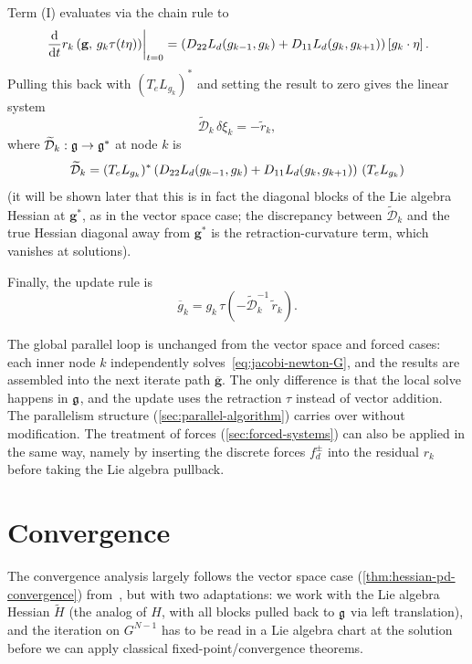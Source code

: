 Term (I) evaluates via the chain rule to
\[
	\odv*{r_k\left(\mathbf{g},\, g_k\tau(t\eta)\right)}{t}_{t=0}
	= \left(\mdif{22}\Ld(g_{k-1},g_k) + \mdif{11}\Ld(g_k,g_{k+1})\right)\left[g_k \cdot \eta\right].
\]
Pulling this back with $(T_e L_{g_k})^*$ and setting the result to zero gives the linear system
\begin{equation}
	\widetilde{\mathcal{D}}_k\, \delta \xi_k = -\widetilde{r}_k,
	\tag{Jacobi-Newton-G}
	\label{eq:jacobi-newton-G}
\end{equation}
where $\widetilde{\mathcal{D}}_k : {\mathfrak{g}} \to {\mathfrak{g}}^*$ at node $k$ is
\begin{equation}
	\widetilde{\mathcal{D}}_k = (T_e L_{g_k})^* \left(D_{22} L_d(g_{k-1}, g_k) + D_{11} L_d(g_k, g_{k+1})\right)\, (T_e L_{g_k})
	\label{eq:lie-jacobi-newton-blocks}
\end{equation}
(it will be shown later that this is in fact the diagonal blocks of the Lie algebra Hessian at $\mathbf{g}^*$, as in the vector space case; the discrepancy between $\widetilde{\mathcal{D}}_k$ and the true Hessian diagonal away from $\mathbf{g}^*$ is the retraction-curvature term, which vanishes at solutions).

Finally, the update rule is
\begin{equation}
	\overline{g}_k = g_k\, \tau\left(-\widetilde{\mathcal{D}}_k^{-1}\, \widetilde{r}_k\right).
	\label{eq:jacobi-newton-G-update}
\end{equation}

The global parallel loop is unchanged from the vector space and forced cases: each inner node $k$ independently solves~\eqref{eq:jacobi-newton-G}, and the results are assembled into the next iterate path $\overline{\mathbf{g}}$.
The only difference is that the local solve happens in ${\mathfrak{g}}$, and the update uses the retraction $\tau$ instead of vector addition.
The parallelism structure (\cref{sec:parallel-algorithm}) carries over without modification. The treatment of forces (\cref{sec:forced-systems}) can also be applied in the same way, namely by inserting the discrete forces $f_d^\pm$ into the residual $r_k$ before taking the Lie algebra pullback.

\section{Convergence}\label{sec:lie-groups-convergence}

The convergence analysis largely follows the vector space case (\cref{thm:hessian-pd-convergence}) from~\cite{ferraroParallelIterativeMethod2025}, but with two adaptations: we work with the Lie algebra Hessian $\widetilde{H}$ (the analog of $H$, with all blocks pulled back to ${\mathfrak{g}}$ via left translation), and the iteration on $G^{N-1}$ has to be read in a Lie algebra chart at the solution before we can apply classical fixed-point/convergence theorems.

